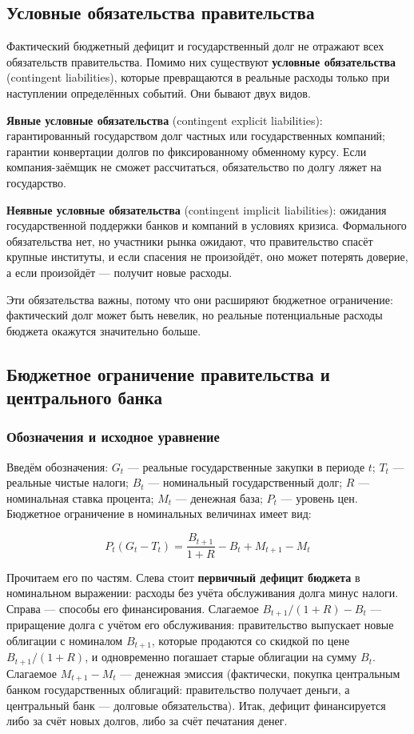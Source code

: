 \documentclass[11pt,a4paper]{article}
\begin{document}
\subsection{Условные обязательства правительства}

Фактический бюджетный дефицит и государственный долг не отражают всех обязательств правительства. Помимо них существуют \textbf{условные обязательства} (contingent liabilities), которые превращаются в реальные расходы только при наступлении определённых событий. Они бывают двух видов.

\textbf{Явные условные обязательства} (contingent explicit liabilities): гарантированный государством долг частных или государственных компаний; гарантии конвертации долгов по фиксированному обменному курсу. Если компания-заёмщик не сможет рассчитаться, обязательство по долгу ляжет на государство.

\textbf{Неявные условные обязательства} (contingent implicit liabilities): ожидания государственной поддержки банков и компаний в условиях кризиса. Формального обязательства нет, но участники рынка ожидают, что правительство спасёт крупные институты, и если спасения не произойдёт, оно может потерять доверие, а если произойдёт --- получит новые расходы.

Эти обязательства важны, потому что они расширяют бюджетное ограничение: фактический долг может быть невелик, но реальные потенциальные расходы бюджета окажутся значительно больше.

\subsection{Бюджетное ограничение правительства и центрального банка}

\subsubsection{Обозначения и исходное уравнение}

Введём обозначения: $G_t$ --- реальные государственные закупки в периоде $t$; $T_t$ --- реальные чистые налоги; $B_t$ --- номинальный государственный долг; $R$ --- номинальная ставка процента; $M_t$ --- денежная база; $P_t$ --- уровень цен. Бюджетное ограничение в номинальных величинах имеет вид:
\begin{formulabox}
\begin{equation}
P_t(G_t-T_t)=\frac{B_{t+1}}{1+R}-B_t+M_{t+1}-M_t \tag{1}
\end{equation}
\end{formulabox}
Прочитаем его по частям. Слева стоит \textbf{первичный дефицит бюджета} в номинальном выражении: расходы без учёта обслуживания долга минус налоги. Справа --- способы его финансирования. Слагаемое $B_{t+1}/(1+R)-B_t$ --- приращение долга с учётом его обслуживания: правительство выпускает новые облигации с номиналом $B_{t+1}$, которые продаются со скидкой по цене $B_{t+1}/(1+R)$, и одновременно погашает старые облигации на сумму $B_t$. Слагаемое $M_{t+1}-M_t$ --- денежная эмиссия (фактически, покупка центральным банком государственных облигаций: правительство получает деньги, а центральный банк --- долговые обязательства). Итак, дефицит финансируется либо за счёт новых долгов, либо за счёт печатания денег.
\end{document}
